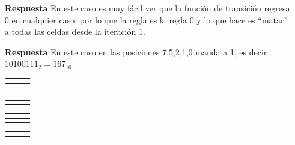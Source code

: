 \documentclass{article}
\begin{document}
\begin{enumerate}
\begin{tabular}{c|c|c} %
  \hline
 \multicolumn{1}{|c|}{ }&\cellcolor{gray} & \multicolumn{1}{c|}{\cellcolor{gray}}  \\
  \hline
 &  & \\
\cline{2-2}
\end{tabular}
\quad
\begin{tabular}{c|c|c}  %
  \hline
 \multicolumn{1}{|c|}{ }&\cellcolor{gray} & \multicolumn{1}{c|}{ }  \\
  \hline
 &  & \\
\cline{2-2}
\end{tabular}
\quad
\begin{tabular}{c|c|c} %
  \hline
 \multicolumn{1}{|c|}{ }&  & \multicolumn{1}{c|}{\cellcolor{gray}}  \\
  \hline
 &  & \\
\cline{2-2}
\end{tabular}
\quad
\begin{tabular}{c|c|c}  %
  \hline
 \multicolumn{1}{|c|}{ }&  & \multicolumn{1}{c|}{ }  \\
  \hline
 &  & \\
\cline{2-2}
\end{tabular}

\item[\bf{Respuesta}] En este caso es muy fácil ver que la función de transición regresa $0$ en cualquier caso, por lo que la regla es la regla $0$ y lo que hace es ``matar'' a todas las celdas desde la iteración 1. 


\item[\bf{Respuesta}] En este caso en las posiciones 7,5,2,1,0 manda a 1, es decir $10100111_2=167_{10}$


\begin{tabular}{c|c|c} %
  \hline
 \multicolumn{1}{|c|}{\cellcolor{gray}}&\cellcolor{gray}&\multicolumn{1}{c|}{\cellcolor{gray}}\\
  \hline
 & \cellcolor{gray} & \\
\cline{2-2}
\end{tabular}
\quad 
\begin{tabular}{c|c|c} %
  \hline
 \multicolumn{1}{|c|}{\cellcolor{gray}}&\cellcolor{gray}& \multicolumn{1}{c|}{}\\
  \hline
 &  & \\
\cline{2-2}
\end{tabular}
\quad 
\begin{tabular}{c|c|c}%
  \hline
 \multicolumn{1}{|c|}{\cellcolor{gray}}& & \multicolumn{1}{c|}{\cellcolor{gray}}\\
  \hline
 & \cellcolor{gray}  & \\
\cline{2-2}
\end{tabular}
\quad
\begin{tabular}{c|c|c} %
  \hline
 \multicolumn{1}{|c|}{\cellcolor{gray}}& & \multicolumn{1}{c|}{ }  \\
  \hline
 & & \\
\cline{2-2}
\end{tabular}\\


\end{enumerate}
\end{document}
